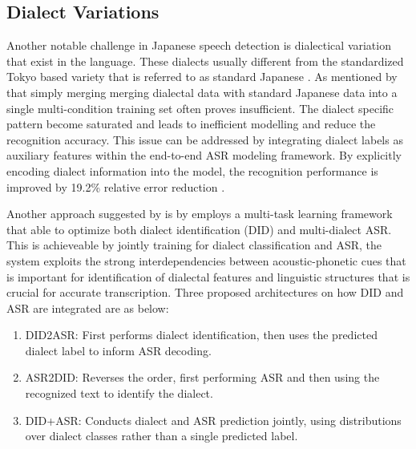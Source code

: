 


\subsection{Dialect Variations}  
Another notable challenge in Japanese speech detection is dialectical variation that exist in the language. These dialects usually different from the standardized Tokyo based variety that is referred to as standard Japanese \parencite{takahashi2024comparison}. As mentioned by \textcite{Imaizumi2020Dialect-Aware} that simply merging merging dialectal data with standard Japanese data into a single multi-condition training set often proves insufficient. The dialect specific pattern become saturated and leads to inefficient modelling and reduce the recognition accuracy. This issue can be addressed by integrating dialect labels as auxiliary features within the end-to-end ASR modeling framework. By explicitly encoding dialect information into the model, the recognition performance is improved by 19.2\% relative error reduction \parencite{Imaizumi2020Dialect-Aware}.

Another approach suggested by \textcite{imaizumi2022} is by employs a multi-task learning framework that able to optimize both dialect identification (DID) and multi-dialect ASR. This is achieveable by jointly training for dialect classification and ASR, the system exploits the strong interdependencies between acoustic-phonetic cues that is important for identification of dialectal features and linguistic structures that is crucial for accurate transcription. Three proposed architectures on how DID and ASR are integrated are as below:

\begin{enumerate}
    \item DID2ASR: First performs dialect identification, then uses the predicted dialect label to inform ASR decoding. 
    \item ASR2DID: Reverses the order, first performing ASR and then using the recognized text to identify the dialect. 
    \item DID+ASR: Conducts dialect and ASR prediction jointly, using distributions over dialect classes rather than a single predicted label.
\end{enumerate}

